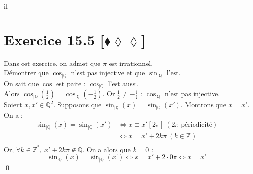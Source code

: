 il\documentclass[10pt]{article}
\begin{document}
\section*{Exercice 15.5 [$\blacklozenge\lozenge\lozenge$]}
\begin{tcolorbox}[enhanced, width=7.6in, center, size=fbox, fontupper=\large, drop shadow southwest]
    Dans cet exercice, on admet que $\pi$ est irrationnel.\\
    Démontrer que $\cos_{|\mathbb{Q}}$ n'est pas injective et que $\sin_{|\mathbb{Q}}$ l'est.\\[0.2cm]
    On sait que $\cos$ est paire : $\cos_{|\mathbb{Q}}$ l'est aussi.\\
    Alors $\cos_{|\mathbb{Q}}(\frac{1}{2}) = \cos_{|\mathbb{Q}}(-\frac{1}{2})$. Or $\frac{1}{2} \neq -\frac{1}{2}$ : $\cos_{|\mathbb{Q}}$ n'est pas injective.\\[0.2cm]
    Soient $x,x'\in\mathbb{Q}^2$. Supposons que $\sin_{|\mathbb{Q}}(x) = \sin_{|\mathbb{Q}}(x')$. Montrons que $x=x'$.\\
    On a :
    \begin{align*}
        \sin_{|\mathbb{Q}}(x) = \sin_{|\mathbb{Q}}(x') &\iff x \equiv x' [2\pi] ~ (2\pi\text{-périodicité}) \\
        &\iff x = x' + 2k\pi ~ (k\in\mathbb{Z})\\
    \end{align*}
    Or, $\forall{k\in\mathbb{Z}^*}, ~ x' + 2k\pi \notin \mathbb{Q}$. On a alors que $k=0$ :
    \begin{equation*}
        \sin_{|\mathbb{Q}}(x) = \sin_{|\mathbb{Q}}(x') \iff x = x' + 2\cdot0\pi \iff x = x'
    \end{equation*}
    \qed
\end{tcolorbox}
\end{document}
